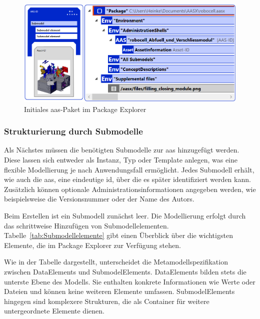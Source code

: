 \newpage
\begin{figure}[htbp]
    \centering
    \includegraphics[width=\textwidth]{Bilder/ModellierungAAS/Final/AASPaketPackageExplorer.PNG}
    \caption[Initiales \acs{aas}-Paket im Package Explorer]{Initiales \acs{aas}-Paket im Package Explorer}
    \label{fig:NeuesAASPaket}
\end{figure}



\subsubsection*{Strukturierung durch Submodelle}
\vspace{-0.5em}

Als Nächstes müssen die benötigten Submodelle zur \acs{aas} hinzugefügt werden.
Diese lassen sich entweder als Instanz, Typ oder Template anlegen, was eine flexible Modellierung je nach Anwendungsfall ermöglicht.
Jedes Submodell erhält, wie auch die \acs{aas}, eine eindeutige \acs{id}, über die es später identifiziert werden kann.
Zusätzlich können optionale Administrationsinformationen angegeben werden, wie beispielsweise die Versionsnummer oder der Name des Autors.

Beim Erstellen ist ein Submodell zunächst leer. 
Die Modellierung erfolgt durch das schrittweise Hinzufügen von Submodellelementen.
Tabelle~\ref{tab:Submodellelemente} gibt einen Überblick über die wichtigsten Elemente, die im Package Explorer zur Verfügung stehen.

\vspace{0.5em}

\vspace{-0.5em}

Wie in der Tabelle dargestellt, unterscheidet die Metamodellspezifikation \cite{SpezifikationPart1} zwischen DataElements und SubmodelElements.
DataElements bilden stets die unterste Ebene des Modells. 
Sie enthalten konkrete Informationen wie Werte oder Dateien und können keine weiteren Elemente umfassen.
SubmodelElements hingegen sind komplexere Strukturen, die als Container für weitere untergeordnete Elemente dienen.

